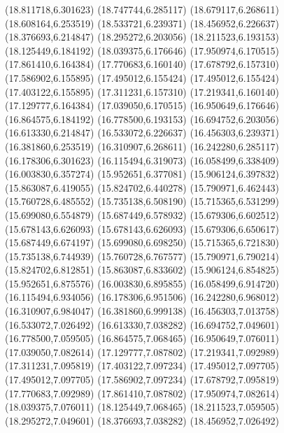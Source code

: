 {{\lineto(18.811718,6.301623)
\lineto(18.747744,6.285117)
\lineto(18.679117,6.268611)
\lineto(18.608164,6.253519)
\lineto(18.533721,6.239371)
\lineto(18.456952,6.226637)
\lineto(18.376693,6.214847)
\lineto(18.295272,6.203056)
\lineto(18.211523,6.193153)
\lineto(18.125449,6.184192)
\lineto(18.039375,6.176646)
\lineto(17.950974,6.170515)
\lineto(17.861410,6.164384)
\lineto(17.770683,6.160140)
\lineto(17.678792,6.157310)
\lineto(17.586902,6.155895)
\lineto(17.495012,6.155424)
\lineto(17.495012,6.155424)
\lineto(17.403122,6.155895)
\lineto(17.311231,6.157310)
\lineto(17.219341,6.160140)
\lineto(17.129777,6.164384)
\lineto(17.039050,6.170515)
\lineto(16.950649,6.176646)
\lineto(16.864575,6.184192)
\lineto(16.778500,6.193153)
\lineto(16.694752,6.203056)
\lineto(16.613330,6.214847)
\lineto(16.533072,6.226637)
\lineto(16.456303,6.239371)
\lineto(16.381860,6.253519)
\lineto(16.310907,6.268611)
\lineto(16.242280,6.285117)
\lineto(16.178306,6.301623)
\lineto(16.115494,6.319073)
\lineto(16.058499,6.338409)
\lineto(16.003830,6.357274)
\lineto(15.952651,6.377081)
\lineto(15.906124,6.397832)
\lineto(15.863087,6.419055)
\lineto(15.824702,6.440278)
\lineto(15.790971,6.462443)
\lineto(15.760728,6.485552)
\lineto(15.735138,6.508190)
\lineto(15.715365,6.531299)
\lineto(15.699080,6.554879)
\lineto(15.687449,6.578932)
\lineto(15.679306,6.602512)
\lineto(15.678143,6.626093)
\lineto(15.678143,6.626093)
\lineto(15.679306,6.650617)
\lineto(15.687449,6.674197)
\lineto(15.699080,6.698250)
\lineto(15.715365,6.721830)
\lineto(15.735138,6.744939)
\lineto(15.760728,6.767577)
\lineto(15.790971,6.790214)
\lineto(15.824702,6.812851)
\lineto(15.863087,6.833602)
\lineto(15.906124,6.854825)
\lineto(15.952651,6.875576)
\lineto(16.003830,6.895855)
\lineto(16.058499,6.914720)
\lineto(16.115494,6.934056)
\lineto(16.178306,6.951506)
\lineto(16.242280,6.968012)
\lineto(16.310907,6.984047)
\lineto(16.381860,6.999138)
\lineto(16.456303,7.013758)
\lineto(16.533072,7.026492)
\lineto(16.613330,7.038282)
\lineto(16.694752,7.049601)
\lineto(16.778500,7.059505)
\lineto(16.864575,7.068465)
\lineto(16.950649,7.076011)
\lineto(17.039050,7.082614)
\lineto(17.129777,7.087802)
\lineto(17.219341,7.092989)
\lineto(17.311231,7.095819)
\lineto(17.403122,7.097234)
\lineto(17.495012,7.097705)
\lineto(17.495012,7.097705)
\lineto(17.586902,7.097234)
\lineto(17.678792,7.095819)
\lineto(17.770683,7.092989)
\lineto(17.861410,7.087802)
\lineto(17.950974,7.082614)
\lineto(18.039375,7.076011)
\lineto(18.125449,7.068465)
\lineto(18.211523,7.059505)
\lineto(18.295272,7.049601)
\lineto(18.376693,7.038282)
\lineto(18.456952,7.026492)
}}
